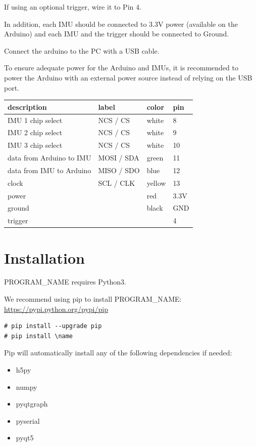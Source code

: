 \documentclass[11pt,letterpaper,article,oneside]{memoir}
\newcommand{\name}{PROGRAM\_NAME}
\begin{document}
If using an optional trigger, wire it to Pin 4.

In addition, each IMU should be connected to 3.3V power (available on the
Arduino) and each IMU and the trigger should be connected to Ground.

Connect the arduino to the PC with a USB cable.

To ensure adequate power for the Arduino and IMUs, it is recommended to power
the Arduino with an external power source instead of relying on the USB port.





\begin{table}
\centering
\begin{tabular}{@{}*4l@{}}
\toprule
description & label & color & pin \\
\midrule 
IMU 1 chip select & NCS / CS & white & 8 \\
IMU 2 chip select & NCS / CS & white & 9 \\
IMU 3 chip select & NCS / CS & white & 10 \\
data from Arduino to IMU & MOSI / SDA & green & 11 \\
data from IMU to Arduino & MISO / SDO & blue & 12 \\
clock & SCL / CLK & yellow & 13 \\
power &  & red & 3.3V \\
ground &  & black & GND \\
trigger &  &  & 4 \\
\bottomrule
\end{tabular}
\label{tab:wiring}
\end{table}




\section{Installation}

\name{} requires Python3.

We recommend using pip to install \name{}:
\url{https://pypi.python.org/pypi/pip}

\begin{verbatim}
# pip install --upgrade pip
# pip install \name
\end{verbatim}

Pip will automatically install any of the following dependencies if needed:
\begin{itemize}
\item h5py
\item numpy
\item pyqtgraph
\item pyserial
\item pyqt5
\end{itemize}
\end{document}
